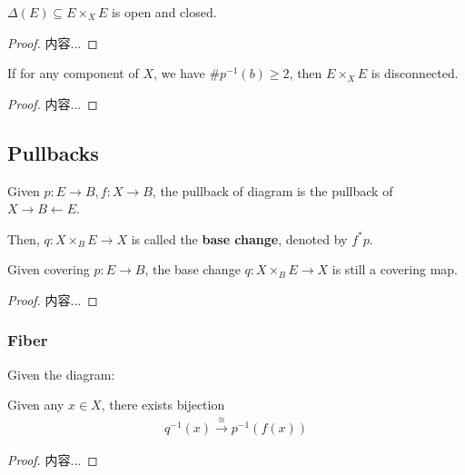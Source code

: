 \documentclass[Total.tex]{subfiles}
\begin{document}
			\begin{proposition}
				$\Delta(E)\subseteq E\times_X E$ is open and closed.
			\end{proposition}
			\begin{proof}
				内容...
			\end{proof}
			
			\begin{corollary}
				If for any component of $X$, we have $\#p^{-1}(b)\geq 2$, then $E\times_X E$ is disconnected.
			\end{corollary}
			\begin{proof}
				内容...
			\end{proof}
			\subsection{Pullbacks}
			\begin{Def}
				Given $p:E\rightarrow B,f:X\rightarrow B$, the pullback of diagram is the pullback of $X\rightarrow B\leftarrow E$. 
				
				Then, $q:X\times_B E\rightarrow X$ is called the \textbf{base change}, denoted by $f^*p$.
			\end{Def}
			\begin{proposition}
				Given covering $p:E\rightarrow B$, the base change $q:X\times_B E\rightarrow X$ is still a covering map. 
			\end{proposition}
			\begin{proof}
				内容...
			\end{proof}
			
			\subsubsection{Fiber}
			
			Given the diagram:
			\begin{center}
			\end{center}
			
			\begin{proposition}
				Given any $x\in X$, there exists bijection 
				\begin{gather*}
					q^{-1}(x)\stackrel{\cong }{\rightarrow}p^{-1}(f(x))
				\end{gather*}
			\end{proposition}
			\begin{proof}
				内容...
			\end{proof}
			
\end{document}
